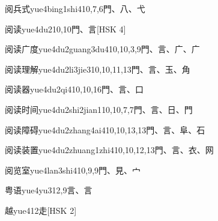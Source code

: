 \begin{entry}{阅兵式}{yue4bing1shi4}{10,7,6}{⾨、⼋、⼷}
\end{entry}

\begin{entry}{阅读}{yue4du2}{10,10}{⾨、⾔}[HSK 4]
\end{entry}

\begin{entry}{阅读广度}{yue4du2guang3du4}{10,10,3,9}{⾨、⾔、⼴、⼴}
\end{entry}

\begin{entry}{阅读理解}{yue4du2li3jie3}{10,10,11,13}{⾨、⾔、⽟、⾓}
\end{entry}

\begin{entry}{阅读器}{yue4du2qi4}{10,10,16}{⾨、⾔、⼝}
\end{entry}

\begin{entry}{阅读时间}{yue4du2shi2jian1}{10,10,7,7}{⾨、⾔、⽇、⾨}
\end{entry}

\begin{entry}{阅读障碍}{yue4du2zhang4ai4}{10,10,13,13}{⾨、⾔、⾩、⽯}
\end{entry}

\begin{entry}{阅读装置}{yue4du2zhuang1zhi4}{10,10,12,13}{⾨、⾔、⾐、⽹}
\end{entry}

\begin{entry}{阅览室}{yue4lan3shi4}{10,9,9}{⾨、⾒、⼧}
\end{entry}

\begin{entry}{粤语}{yue4yu3}{12,9}{⾔、⾔}
\end{entry}

\begin{entry}{越}{yue4}{12}{⾛}[HSK 2]
\end{entry}

